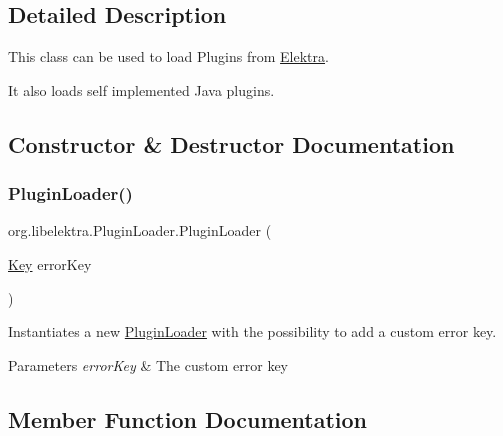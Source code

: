 \subsection{Detailed Description}
This class can be used to load Plugins from \mbox{\hyperlink{interfaceorg_1_1libelektra_1_1Elektra}{Elektra}}. 

It also loads self implemented Java plugins. 

\subsection{Constructor \& Destructor Documentation}
\mbox{\label{classorg_1_1libelektra_1_1PluginLoader_a4b09bcfc261043549a8f77d193fcf28a}} 
\subsubsection{\texorpdfstring{PluginLoader()}{PluginLoader()}}
{\footnotesize\ttfamily org.\+libelektra.\+Plugin\+Loader.\+Plugin\+Loader (\begin{DoxyParamCaption}\item[{\mbox{\hyperlink{classorg_1_1libelektra_1_1Key}{Key}}}]{error\+Key }\end{DoxyParamCaption})\hspace{0.3cm}{\ttfamily [inline]}}



Instantiates a new \mbox{\hyperlink{classorg_1_1libelektra_1_1PluginLoader}{Plugin\+Loader}} with the possibility to add a custom error key. 


\begin{DoxyParams}{Parameters}
{\em error\+Key} & The custom error key \\
\hline
\end{DoxyParams}


\subsection{Member Function Documentation}
\mbox{\label{classorg_1_1libelektra_1_1PluginLoader_a0bf523c047b71f45a4f0cad2b3c7fb60}} 
